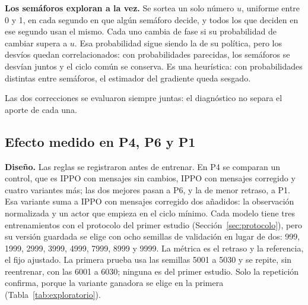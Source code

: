 \textbf{Los semáforos exploran a la vez.} Se sortea un solo número $u$,
uniforme entre 0 y 1, en cada segundo en que algún semáforo decide, y
todos los que deciden en ese segundo usan el mismo. Cada uno cambia de
fase si su probabilidad de cambiar supera a $u$. Esa probabilidad sigue
siendo la de su política, pero los desvíos quedan correlacionados: con
probabilidades parecidas, los semáforos se desvían juntos y el ciclo
común se conserva. Es una heurística: con probabilidades distintas entre
semáforos, el estimador del gradiente queda sesgado.

Las dos correcciones se evaluaron siempre juntas: el diagnóstico no
separa el aporte de cada una.

\subsection*{Efecto medido en P4, P6 y P1}

\textbf{Diseño.} Las reglas se registraron antes de entrenar. En P4 se
comparan un control, que es IPPO con mensajes sin cambios, IPPO con
mensajes corregido y cuatro variantes más; las dos mejores pasan a P6,
y la de menor retraso, a P1. Esa variante suma a IPPO con mensajes
corregido dos añadidos: la observación normalizada y un actor que
empieza en el ciclo mínimo. Cada modelo tiene tres entrenamientos con
el protocolo del primer estudio (Sección~\ref{sec:protocolo}), pero su
versión guardada se elige con ocho semillas de validación en lugar de
dos: 999, 1999, 2999, 3999, 4999, 7999, 8999 y 9999. La métrica es el
retraso y la referencia, el fijo ajustado. La primera prueba usa las
semillas 5001 a 5030 y se repite, sin reentrenar, con las 6001 a 6030;
ninguna es del primer estudio. Solo la repetición confirma, porque la
variante ganadora se elige en la primera
(Tabla~\ref{tab:exploratorio}).

